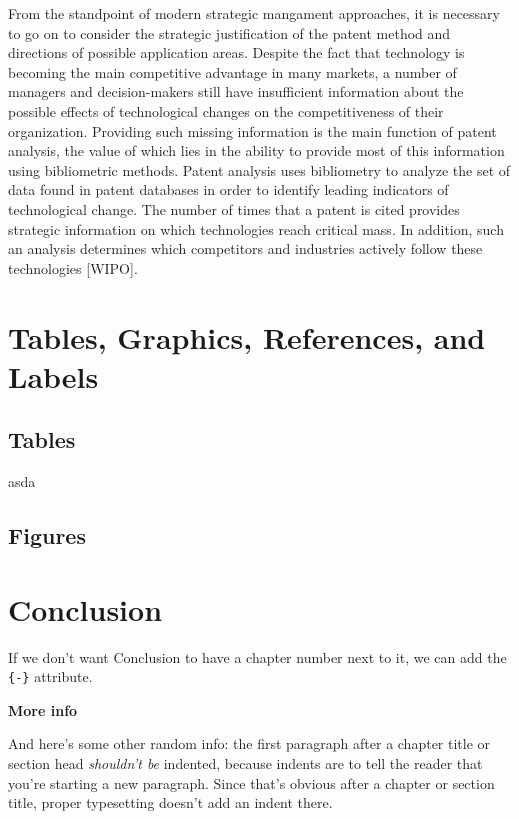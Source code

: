 \documentclass[12pt,twoside]{reedthesis}
\begin{document}
From the standpoint of modern strategic mangament approaches, it is necessary to go on to consider the strategic justification of the patent method and directions of possible application areas. Despite the fact that technology is becoming the main competitive advantage in many markets, a number of managers and decision-makers still have insufficient information about the possible effects of technological changes on the competitiveness of their organization. Providing such missing information is the main function of patent analysis, the value of which lies in the ability to provide most of this information using bibliometric methods. Patent analysis uses bibliometry to analyze the set of data found in patent databases in order to identify leading indicators of technological change. The number of times that a patent is cited provides strategic information on which technologies reach critical mass. In addition, such an analysis determines which competitors and industries actively follow these technologies {[}WIPO{]}.

\hypertarget{tables-graphics-references-and-labels}{%
\chapter{Tables, Graphics, References, and Labels}\label{tables-graphics-references-and-labels}}

\hypertarget{tables}{%
\section{Tables}\label{tables}}

asda

\clearpage

\hypertarget{figures}{%
\section{Figures}\label{figures}}

\hypertarget{conclusion}{%
\chapter*{Conclusion}\label{conclusion}}

If we don't want Conclusion to have a chapter number next to it, we can add the \texttt{\{-\}} attribute.

\textbf{More info}

And here's some other random info: the first paragraph after a chapter title or section head \emph{shouldn't be} indented, because indents are to tell the reader that you're starting a new paragraph. Since that's obvious after a chapter or section title, proper typesetting doesn't add an indent there.
\end{document}
